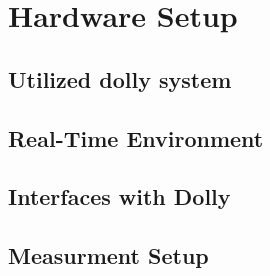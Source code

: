 \documentclass[ExampleMasters.tex]{subfiles}
\begin{document}
\clearpage


\chapter{Hardware Setup}
\label{chap:hardware_setup}
\section{Utilized dolly system}
\label{sec:dolly_system}
\section{Real-Time Environment}
\label{sec:realtime_environment}
\section{Interfaces with Dolly}
\label{sec:interface_with_dolly}
\section{Measurment Setup}
\label{sec:measurement_setup}
\end{document}
